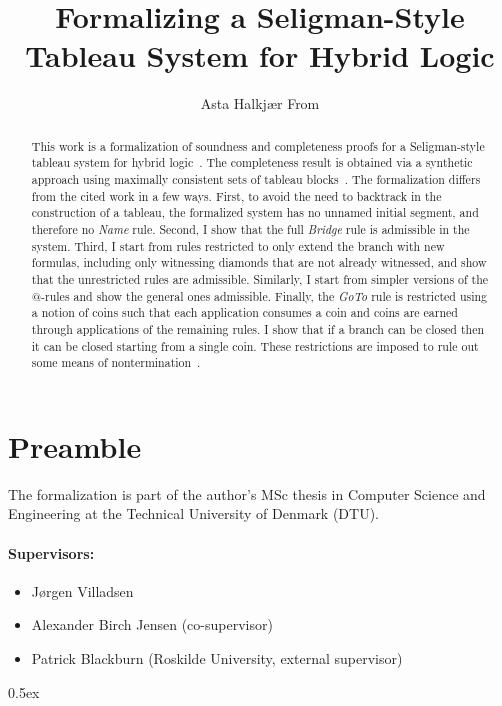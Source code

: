 \documentclass[11pt,a4paper]{article}
\begin{document}
\title{Formalizing a Seligman-Style Tableau System for Hybrid Logic}
\author{Asta Halkjær From}
\maketitle

\begin{abstract}
  This work is a formalization of soundness and completeness proofs for a Seligman-style tableau system for hybrid logic~\cite{jlog17}.
  The completeness result is obtained via a synthetic approach using maximally consistent sets of tableau blocks~\cite{aiml16}.
  The formalization differs from the cited work in a few ways.
  First, to avoid the need to backtrack in the construction of a tableau, the formalized system has no unnamed initial segment, and therefore no \textit{Name} rule.
  Second, I show that the full \textit{Bridge} rule is admissible in the system.
  Third, I start from rules restricted to only extend the branch with new formulas, including only witnessing diamonds that are not already witnessed, and show that the unrestricted rules are admissible.
  Similarly, I start from simpler versions of the \( @ \)-rules and show the general ones admissible.
  Finally, the \textit{GoTo} rule is restricted using a notion of coins such that each application consumes a coin and coins are earned through applications of the remaining rules.
  I show that if a branch can be closed then it can be closed starting from a single coin.
  These restrictions are imposed to rule out some means of nontermination~\cite{jlog17}.
\end{abstract}

\section*{Preamble}

The formalization is part of the author's MSc thesis in Computer Science and Engineering at the Technical University of Denmark (DTU).

\paragraph{Supervisors:}

\begin{itemize}
  \item Jørgen Villadsen
  \item Alexander Birch Jensen (co-supervisor)
  \item Patrick Blackburn (Roskilde University, external supervisor)
\end{itemize}

\newpage
\tableofcontents

\newpage

\parindent 0pt\parskip 0.5ex



\nocite{*}




\end{document}
